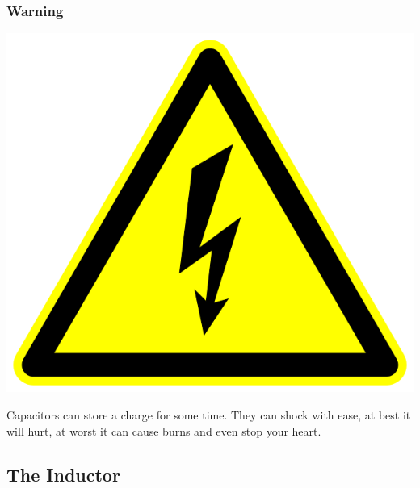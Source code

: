 \documentclass[10pt]{beamer}
\begin{document}
\begin{frame}
\frametitle{Warning}
\begin{center}
\includegraphics[height=.5\textheight]{shockhazard.png}
\end{center}
Capacitors can store a charge for some time. They can shock with ease, at best it will hurt, at worst it can cause burns and even stop your heart.
\end{frame}

\subsection{The Inductor}
\end{document}
